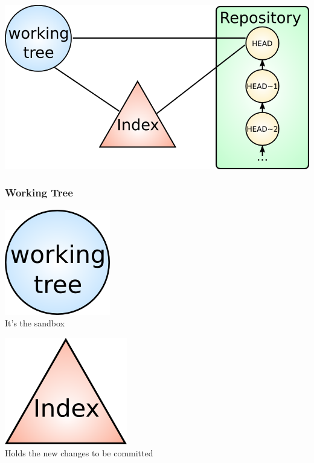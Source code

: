 \begin{frame}[plain]
  \frametitle{\insertsubsection}

  \begin{center}
    \includegraphics[width=1.0\textwidth]{images/git-layout.png}
  \end{center}
\end{frame}


\subsubsection{Working Tree}


\begin{frame}

  \begin{center}
    \includegraphics[width=.25\textwidth]{images/git-working-tree.png}\\\vspacing
    \Large{It's the sandbox}
  \end{center}
\end{frame}


\begin{frame}

  \begin{center}
    \includegraphics[width=.25\textwidth]{images/git-index.png}\\\vspacing
    \Large{Holds the new changes to be committed}
  \end{center}
\end{frame}

